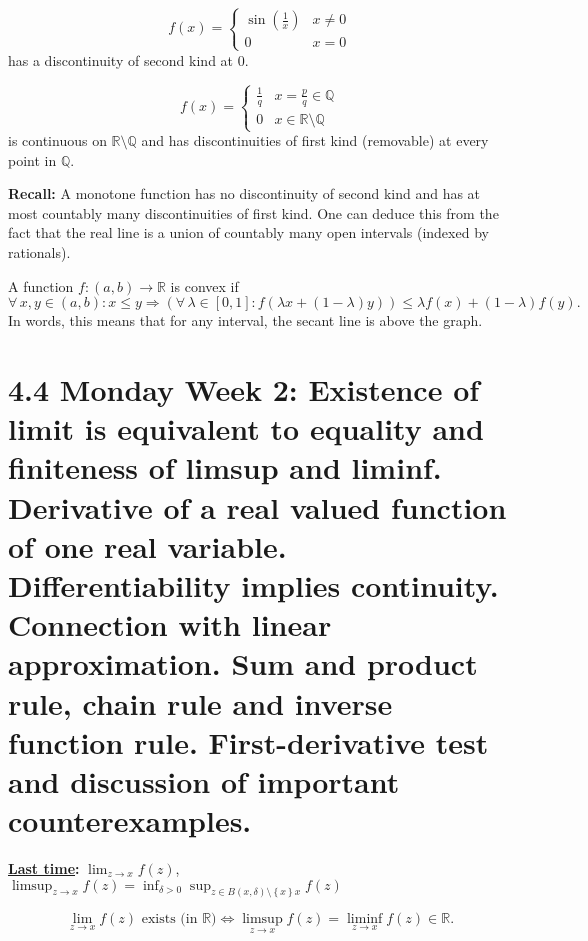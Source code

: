 \documentclass{notes}
\begin{document}
  \begin{eg}
    \[
      f(x) = \begin{cases}
        \sin \left ( \frac{1}{x} \right ) & x \neq 0 \\ 
        0 & x = 0
      \end{cases}
    \]
    has a discontinuity of second kind at 0.
  \end{eg}
  
  \begin{eg}
    \[
      f(x) = \begin{cases}
        \frac{1}{q} & x = \frac{p}{q} \in \mathbb Q \\ 
        0 & x \in \mathbb R \setminus \mathbb Q
      \end{cases}
    \]
    is continuous on $\mathbb R \setminus \mathbb Q$ and has discontinuities of first kind (removable) at every point in $\mathbb Q$.
  \end{eg}
  
  {\boldmath \bfseries Recall:} A monotone function has no discontinuity of second kind and has at most countably many discontinuities of first kind.
  One can deduce this from the fact that the real line is a union of countably many open intervals (indexed by rationals).
  
  \begin{defn}
    A function $f \colon (a, b) \to \mathbb R$ is convex if 
    \[
      \forall \, x, y \in (a, b): x \leq y \Rightarrow (\forall \, \lambda \in [0, 1]: f(\lambda x + (1 - \lambda) y)) \leq \lambda f(x) + (1 - \lambda) f(y).
    \]
    In words, this means that for any interval, the secant line is above the graph.
  \end{defn}
  
  \section{4.4 Monday Week 2: Existence of limit is equivalent to equality and finiteness of limsup and liminf. Derivative of a real valued function of one real variable. Differentiability implies continuity. Connection with linear approximation. Sum and product rule, chain rule and inverse function rule. First-derivative test and discussion of important counterexamples.}
  
  {\boldmath \bfseries \underline{Last time}:} $\lim_{z \to x} f(z)$, $\limsup_{z \to x} f(z) = \inf_{\delta > 0} \sup_{z \in B(x, \delta) \setminus \left \{ x \right \}x} f(z)$
  
  \begin{lem}
    \[
      \lim_{z \to x} f(z) \text{ exists (in $\mathbb R$)} \Leftrightarrow \limsup_{z \to x} f(z) = \liminf_{z \to x} f(z) \in \mathbb R.
    \]
  \end{lem}
  
\end{document}
